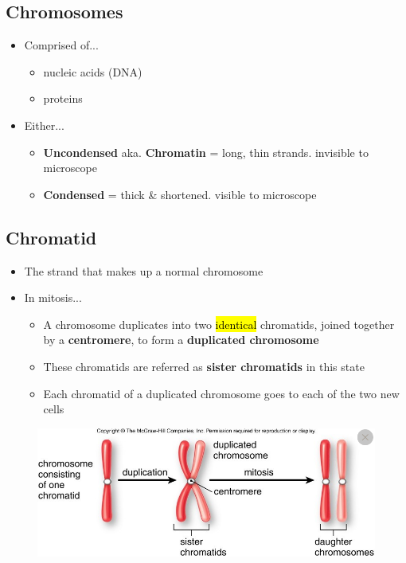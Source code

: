 \documentclass[a4paper,12pt]{article}
\begin{document}
\subsection{Chromosomes}
\begin{itemize}
    \item{
            Comprised of...
            \begin{itemize}
                \item{nucleic acids (DNA)}
                \item{proteins}
            \end{itemize}
        }
    \item{
            Either...
            \begin{itemize}
                \item{\textbf{Uncondensed} aka. \textbf{Chromatin} = long, thin strands. invisible to microscope}
                \item{\textbf{Condensed} = thick \& shortened. visible to microscope}
            \end{itemize}
        }
\end{itemize}

\subsection{Chromatid}
\begin{itemize}
    \item{The strand that makes up a normal chromosome}
    \item{
            In mitosis...
            \begin{itemize}
                \item{A chromosome duplicates into two \hl{identical} chromatids, joined together by a \textbf{centromere}, to form a \textbf{duplicated chromosome}}
                \item{These chromatids are referred as \textbf{sister chromatids} in this state}
                \item{Each chromatid of a duplicated chromosome goes to each of the two new cells}
            \end{itemize}
        }
\end{itemize}

\begin{figure}[H] \includegraphics[width=\textwidth]{chromosome} \end{figure}
\end{document}
